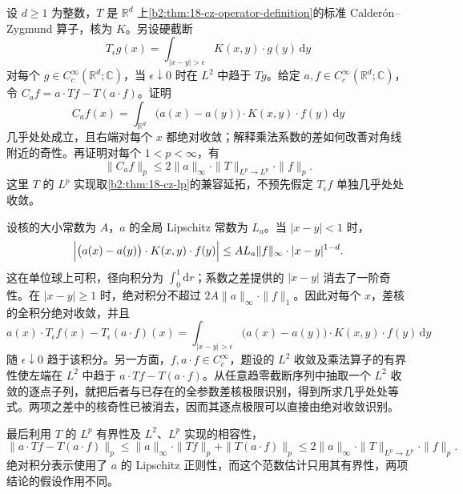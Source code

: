 \begin{exercise}\label{b2:ex:18-new-8}
设 \(d\geq1\) 为整数，\(T\) 是 \(\mathbb R^d\) 上\cref{b2:thm:18-cz-operator-definition}的标准 Calder\'on--Zygmund 算子，核为 \(K\)。另设硬截断
\[
 T_\epsilon g(x)=\int_{|x-y|>\epsilon}K(x,y)\cdot g(y)\,\mathrm dy
\]
对每个 \(g\in C_c^\infty(\mathbb R^d;\mathbb C)\)，当 \(\epsilon\downarrow0\) 时在 \(L^2\) 中趋于 \(Tg\)。给定 \(a,f\in C_c^\infty(\mathbb R^d;\mathbb C)\)，令 \(C_af=a\cdot Tf-T(a\cdot f)\)。证明
\[
 C_af(x)=\int_{\mathbb R^d}\bigl(a(x)-a(y)\bigr)\cdot K(x,y)\cdot f(y)\,\mathrm dy
\]
几乎处处成立，且右端对每个 \(x\) 都绝对收敛；解释乘法系数的差如何改善对角线附近的奇性。再证明对每个 \(1<p<\infty\)，有
\[
 \|C_af\|_p\leq2\|a\|_\infty\cdot\|T\|_{L^p\to L^p}\cdot\|f\|_p.
\]
这里 \(T\) 的 \(L^p\) 实现取\cref{b2:thm:18-cz-lp}的兼容延拓，不预先假定 \(T_\epsilon f\) 单独几乎处处收敛。
\end{exercise}
\begin{solution}
设核的大小常数为 \(A\)，\(a\) 的全局 Lipschitz 常数为 \(L_a\)。当 \(|x-y|<1\) 时，
\[
 \Bigl|\bigl(a(x)-a(y)\bigr)\cdot K(x,y)\cdot f(y)\Bigr|
 \leq A L_a\|f\|_\infty\cdot|x-y|^{1-d}.
\]
这在单位球上可积，径向积分为 \(\int_0^1\mathrm dr\)；系数之差提供的 \(|x-y|\) 消去了一阶奇性。在 \(|x-y|\geq1\) 时，绝对积分不超过 \(2A\|a\|_\infty\cdot\|f\|_1\)。因此对每个 \(x\)，差核的全积分绝对收敛，并且
\[
 a(x)\cdot T_\epsilon f(x)-T_\epsilon(a\cdot f)(x)
 =\int_{|x-y|>\epsilon}\bigl(a(x)-a(y)\bigr)\cdot K(x,y)\cdot f(y)\,\mathrm dy
\]
随 \(\epsilon\downarrow0\) 趋于该积分。另一方面，\(f,a\cdot f\in C_c^\infty\)，题设的 \(L^2\) 收敛及乘法算子的有界性使左端在 \(L^2\) 中趋于 \(a\cdot Tf-T(a\cdot f)\)。从任意趋零截断序列中抽取一个 \(L^2\) 收敛的逐点子列，就把后者与已存在的全参数差核极限识别，得到所求几乎处处等式。两项之差中的核奇性已被消去，因而其逐点极限可以直接由绝对收敛识别。

最后利用 \(T\) 的 \(L^p\) 有界性及 \(L^2\)、\(L^p\) 实现的相容性，
\[
 \|a\cdot Tf-T(a\cdot f)\|_p
 \leq\|a\|_\infty\cdot\|Tf\|_p+\|T(a\cdot f)\|_p
 \leq2\|a\|_\infty\cdot\|T\|_{L^p\to L^p}\cdot\|f\|_p.
\]
绝对积分表示使用了 \(a\) 的 Lipschitz 正则性，而这个范数估计只用其有界性，两项结论的假设作用不同。
\end{solution}

